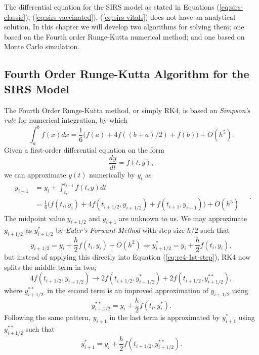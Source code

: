 \documentclass[]{article}
\begin{document}
The differential equation for the SIRS model as stated in Equations (\ref{eq:sirs-classic}), (\ref{eq:sirs-vaccinated}), (\ref{eq:sirs-vitals}) does not have an analytical solution. In this chapter we will develop two algorithms for solving them; one based on the Fourth order Runge-Kutta numerical method; and one based on Monte Carlo simulation.

\subsection{Fourth Order Runge-Kutta Algorithm for the SIRS Model} \label{sec:runge-kutta}
The Fourth Order Runge-Kutta method, or simply RK4, is based on \textit{Simpson's rule} for numerical integration, by which
\begin{equation}
	\int_{a}^{b} f(x) dx = \frac{1}{6} \big( f(a) + 4f((b+a)/2) + f(b) \big) + O(h^5).
\end{equation}
Given a first-order differential equation on the form
\begin{equation}
	\frac{dy}{dt} = f(t, y),
\end{equation}
we can approximate $y(t)$ numerically by $y_t$ as
\begin{equation}
\begin{aligned} \label{eq:re4-1st-step}
		y_{i+1} &= y_i + \int_{t_i}^{t_{i+1}} f(t,y) dt \\
		&= \frac{1}{6} \big( f(t_i, y_i) + 4f(t_{i+1/2}, y_{i+1/2}) + f(t_{i+1}, y_{i+1}) \big) + O(h^5)
\end{aligned} \quad .
\end{equation}
The midpoint value $y_{i+1/2}$ and $y_{i+1}$ are unknown to us. We may approximate $y_{i+1/2}$ as $y^*_{i+1/2}$ by \textit{Euler's Forward Method} with step size $h/2$ such that
\begin{equation}
	y_{i+1/2} = y_i + \frac{h}{2} f(t_i, y_i) + O(h^2) \Rightarrow y^*_{i+1/2} = y_i + \frac{h}{2} f(t_i, y_i),
\end{equation}
but instead of applying this directly into Equation (\ref{eq:re4-1st-step}), RK4 now splits the middle term in two;
\begin{equation}
	4f(t_{i+1/2}, y_{i+1/2}) \rightarrow 2f(t_{i+1/2}, y^{*}_{i+1/2}) + 2f(t_{i+1/2}, y^{**}_{i+1/2}),
\end{equation}
where $y^{**}_{i+1/2}$ in the second term is an improved approximation of $y_{i+1/2}$ using
\begin{equation}
	y^{**}_{i+1/2} = y_i + \frac{h}{2} f(t_i, y^*_i).
\end{equation}
Following the same pattern, $y_{i+1}$ in the last term is approximated by $y^*_{i+1}$ using $y^{**}_{i+1/2}$ such that
\begin{equation}
	y^{*}_{i+1} = y_i + \frac{h}{2} f(t_{i+1/2}, y^{**}_{i+1/2}).
\end{equation}
\end{document}
